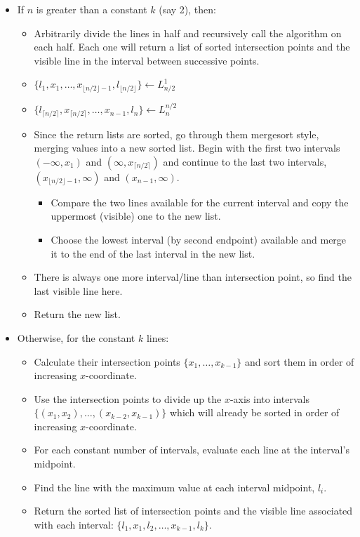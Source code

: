 \documentclass[12pt]{article}
\begin{document}
\begin{itemize}
\item
If $n$ is greater than a constant $k$ (say 2), then:
\begin{itemize}
\item
Arbitrarily divide the
lines in half and recursively call the algorithm on each half.
Each one will return a list of sorted intersection points and
the visible line in the interval between successive points.
\item
$\{l_1, x_1,\ldots ,x_{\lfloor n/2\rfloor-1},l_{\lfloor n/2\rfloor}\} \gets
L^1_{n/2}$
\item
$\{l_{\lceil n/2 \rceil}, x_{\lceil n/2\rceil},\ldots ,x_{n-1},l_n\} \gets
L^{n/2}_{n}$
\item
Since the return lists are sorted,
go through them mergesort style, merging values into a new sorted list.
Begin
with the first two intervals $(-\infty,x_1)$ and
$(\infty,x_{\lceil n/2\rceil})$ and continue to the last two intervals,
$(x_{\lfloor n/2\rfloor-1},\infty)$ and $(x_{n-1},\infty)$.
\begin{itemize}
\item
Compare the two lines available for the current interval
and copy the uppermost (visible) one to
the new list.
\item
Choose the lowest interval (by second endpoint) available and merge it
to the end of the last interval in the new list.
\end{itemize}
\item
There is always one more interval/line than intersection point, so
find the last visible line here.
\item
Return the new list.
\end{itemize}
\item
Otherwise, for the constant $k$ lines:
\begin{itemize}
\item
Calculate their intersection points $\{x_1,\ldots ,x_{k-1}\}$ and sort them in
order of
increasing $x$-coordinate.
\item
Use the intersection points to divide up the $x$-axis into intervals
$\{(x_1,x_2),\ldots ,(x_{k-2},x_{k-1})\}$
which will already be sorted in order of increasing $x$-coordinate.
\item
For each constant number of intervals, evaluate each line at the
interval's midpoint.
\item
Find the line with the maximum value at each interval midpoint, $l_i$.
\item
Return the sorted list of intersection points and the visible line
associated with each interval: $\{l_1, x_1, l_2, \ldots ,x_{k-1}, l_k\}$.
\end{itemize}
\end{itemize}
\end{document}
